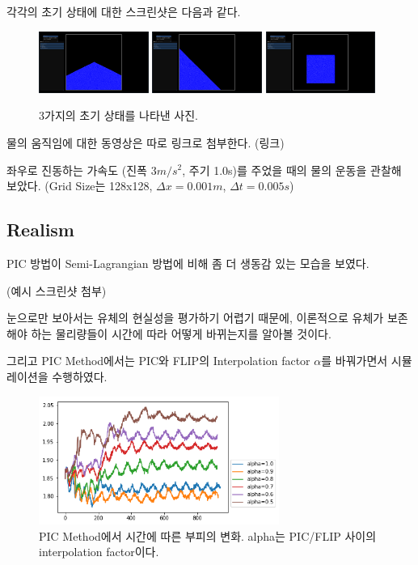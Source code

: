 \documentclass[10pt, A4]{article}
\begin{document}
각각의 초기 상태에 대한 스크린샷은 다음과 같다.

\begin{figure}[h]
\includegraphics[width=0.32\textwidth]{init_state_1}
\includegraphics[width=0.32\textwidth]{init_state_2}
\includegraphics[width=0.32\textwidth]{init_state_3}
  \caption{3가지의 초기 상태를 나타낸 사진.}
\end{figure}

물의 움직임에 대한 동영상은 따로 링크로 첨부한다. (링크)

좌우로 진동하는 가속도 (진폭 3$m/s^2$, 주기 1.0s)를 주었을 때의 물의 운동을 관찰해 보았다. (Grid Size는 128x128, $\Delta x = 0.001m$, $\Delta t = 0.005s$)

\subsection{Realism}

PIC 방법이 Semi-Lagrangian 방법에 비해 좀 더 생동감 있는 모습을 보였다.

(예시 스크린샷 첨부)

눈으로만 보아서는 유체의 현실성을 평가하기 어렵기 때문에, 이론적으로 유체가 보존해야 하는 물리량들이 시간에 따라 어떻게 바뀌는지를 알아볼 것이다. 

그리고 PIC Method에서는 PIC와 FLIP의 Interpolation factor $\alpha$를 바꿔가면서 시뮬레이션을 수행하였다.

\begin{figure}[h]
  \centering
  \includegraphics[width=0.7\textwidth]{picflip-volume-graph}
  \caption{PIC Method에서 시간에 따른 부피의 변화. alpha는 PIC/FLIP 사이의 interpolation factor이다.}
\end{figure}
\end{document}
